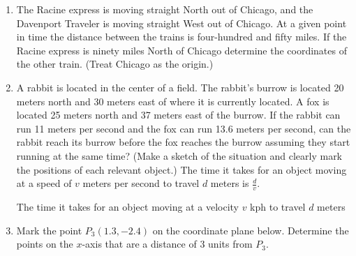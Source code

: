 \begin{enumerate}
\item The Racine express is moving straight North out of Chicago, and
  the Davenport Traveler is moving straight West out of Chicago. At a
  given point in time the distance between the trains is four-hundred
  and fifty miles. If the Racine express is ninety miles North of
  Chicago determine the coordinates of the other train. (Treat Chicago
  as the origin.)

\item A rabbit is located in the center of a field. The rabbit's
  burrow is located 20 meters north and 30 meters east of where it is
  currently located. A fox is located 25 meters north and 37 meters
  east of the burrow. If the rabbit can run 11 meters per second and
  the fox can run 13.6 meters per second, can the rabbit reach its
  burrow before the fox reaches the burrow assuming they start running
  at the same time? (Make a sketch of the situation and clearly mark
  the positions of each relevant object.) The time it takes for an
  object moving at a speed of $v$ meters per second to travel $d$
  meters is $\frac{d}{v}$.

  The time it takes for an object moving at a velocity $v$ kph to travel
  $d$ meters 

  \item Mark the point $P_3(1.3,-2.4)$ on the coordinate plane below. Determine the
  points on the $x$-axis that are a distance of 3 units from $P_3$.



\end{enumerate}
